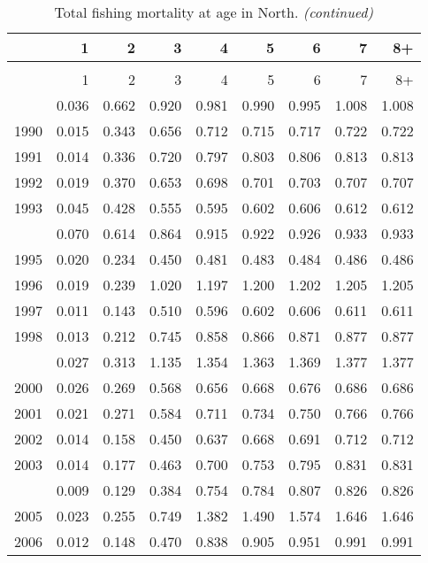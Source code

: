 \documentclass[
]{article}
\begin{document}
\begin{longtable}[t]{lrrrrrrrr}
\caption{\label{tab:North-region-FAA-table}Total fishing mortality at age in North.}\\
\toprule
  & 1 & 2 & 3 & 4 & 5 & 6 & 7 & 8+\\
\midrule
\endfirsthead
\caption[]{Total fishing mortality at age in North. \textit{(continued)}}\\
\toprule
  & 1 & 2 & 3 & 4 & 5 & 6 & 7 & 8+\\
\midrule
\endhead

\endfoot
\bottomrule
\endlastfoot
1989 & 0.036 & 0.662 & 0.920 & 0.981 & 0.990 & 0.995 & 1.008 & 1.008\\
1990 & 0.015 & 0.343 & 0.656 & 0.712 & 0.715 & 0.717 & 0.722 & 0.722\\
1991 & 0.014 & 0.336 & 0.720 & 0.797 & 0.803 & 0.806 & 0.813 & 0.813\\
1992 & 0.019 & 0.370 & 0.653 & 0.698 & 0.701 & 0.703 & 0.707 & 0.707\\
1993 & 0.045 & 0.428 & 0.555 & 0.595 & 0.602 & 0.606 & 0.612 & 0.612\\
\addlinespace
1994 & 0.070 & 0.614 & 0.864 & 0.915 & 0.922 & 0.926 & 0.933 & 0.933\\
1995 & 0.020 & 0.234 & 0.450 & 0.481 & 0.483 & 0.484 & 0.486 & 0.486\\
1996 & 0.019 & 0.239 & 1.020 & 1.197 & 1.200 & 1.202 & 1.205 & 1.205\\
1997 & 0.011 & 0.143 & 0.510 & 0.596 & 0.602 & 0.606 & 0.611 & 0.611\\
1998 & 0.013 & 0.212 & 0.745 & 0.858 & 0.866 & 0.871 & 0.877 & 0.877\\
\addlinespace
1999 & 0.027 & 0.313 & 1.135 & 1.354 & 1.363 & 1.369 & 1.377 & 1.377\\
2000 & 0.026 & 0.269 & 0.568 & 0.656 & 0.668 & 0.676 & 0.686 & 0.686\\
2001 & 0.021 & 0.271 & 0.584 & 0.711 & 0.734 & 0.750 & 0.766 & 0.766\\
2002 & 0.014 & 0.158 & 0.450 & 0.637 & 0.668 & 0.691 & 0.712 & 0.712\\
2003 & 0.014 & 0.177 & 0.463 & 0.700 & 0.753 & 0.795 & 0.831 & 0.831\\
\addlinespace
2004 & 0.009 & 0.129 & 0.384 & 0.754 & 0.784 & 0.807 & 0.826 & 0.826\\
2005 & 0.023 & 0.255 & 0.749 & 1.382 & 1.490 & 1.574 & 1.646 & 1.646\\
2006 & 0.012 & 0.148 & 0.470 & 0.838 & 0.905 & 0.951 & 0.991 & 0.991\\

\end{longtable}
\end{document}
